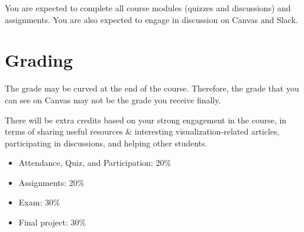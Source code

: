\documentclass[11pt,article,oneside]{memoir} %
\begin{document}
You are expected to complete all course modules (quizzes and discussions) and assignments. You are also expected to engage in discussion on Canvas and Slack. 



\section{Grading}\label{sec:grading_tentative_}%

The grade may be curved at the end of the course. Therefore, the grade that you can see on Canvas may not be the grade you receive finally. 

There will be extra credits based on your strong engagement in the course, in terms of sharing useful resources \& interesting visualization-related articles, participating in discussions, and helping other students.

\begin{itemize}%

\item Attendance, Quiz, and Participation: 20\%

\item Assignments: 20\% 

\item Exam: 30\%

\item Final project: 30\%

\end{itemize}%
\end{document}
